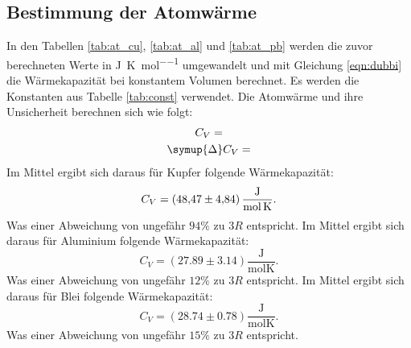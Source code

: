 \subsection{Bestimmung der Atomwärme}
In den Tabellen \ref{tab:at_cu}, \ref{tab:at_al} und \ref{tab:at_pb} werden die zuvor berechneten Werte in \si{\joule\per\kelvin\per\mol} umgewandelt und mit Gleichung \eqref{eqn:dubbi} die Wärmekapazität bei konstantem Volumen berechnet.
Es werden die Konstanten aus Tabelle \ref{tab:const} verwendet.
Die Atomwärme und ihre Unsicherheit berechnen sich wie folgt:
\begin{gather}
    C_V=    \\
    \symup{\Delta}C_V=
%
\end{gather}
\noindent Im Mittel ergibt sich daraus für Kupfer folgende Wärmekapazität:
\begin{equation*}
	C_V=\SI{48.47 \pm 4.84}{\joule\per\mol\per\kelvin}.
\end{equation*}
Was einer Abweichung von ungefähr $94\%$ zu $3R$ entspricht.
\noindent Im Mittel ergibt sich daraus für Aluminium folgende Wärmekapazität:
\begin{equation*}
	C_V=(27.89 \pm 3.14)\frac{\si{\joule}}{\si{\mol \kelvin}}.
\end{equation*}
Was einer Abweichung von ungefähr $12\%$ zu $3R$ entspricht.
\noindent Im Mittel ergibt sich daraus für Blei folgende Wärmekapazität:
\begin{equation*}
	C_V=(28.74 \pm 0.78)\frac{\si{\joule}}{\si{\mol \kelvin}}.
\end{equation*}
Was einer Abweichung von ungefähr $15\%$ zu $3R$ entspricht.

